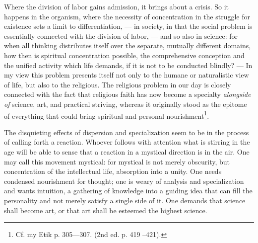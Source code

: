 \documentclass[12pt,a4paper,openany]{book}
\newcommand{\opage}[1]{\marginnote{\footnotesize\textit{[#1]}}}
\begin{document}
Where the division of labor gains admission, it brings about a
crisis. So it happens in the organism, where the necessity
of concentration in the struggle for existence sets a
limit to differentiation, --- in society, in that the social
problem is essentially connected with the division of labor, ---
and so also in science: for when all thinking
distributes itself over the separate, mutually different
domains, how then is spiritual concentration possible,
the comprehensive conception and the unified activity which life
demands, if it is not to be conducted blindly? --- In my
view this problem presents itself not only to the humane
or naturalistic view of life, but also to the religious.
The religious problem in our day is closely connected
with the fact that religious faith has now become a specialty \emph{alongside
of} science, art, and practical striving, whereas it
originally stood as the epitome of everything that could bring
spiritual and personal nourishment\footnote{Cf. my Etik p. 305---307. (2nd ed. p. 419 --421).}.

The disquieting effects of dispersion and
specialization seem to be in the process of calling forth a reaction.
Whoever follows with attention what is stirring
in the age will be able to sense that a reaction in a mystical
direction is in the air. One may call this movement
mystical: for mystical is not merely obscurity, but
concentration of the intellectual life, absorption into a unity. One needs
condensed nourishment for thought; one is weary of analysis and
\opage{182}specialization and wants intuition, a gathering of knowledge into a
guiding idea that can fill the personality and not merely
satisfy a single side of it. One demands that science
shall become art, or that art shall be esteemed the highest
science.
\end{document}
